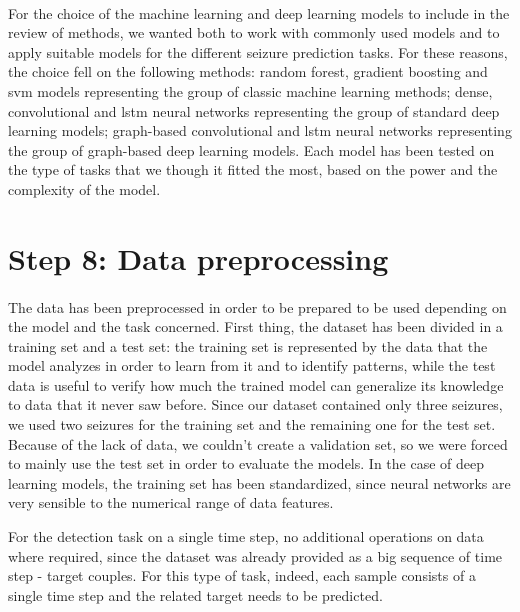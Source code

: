 \paragraph{} For the choice of the machine learning and deep learning models to include in the review of methods, we wanted both to work with commonly used models and to apply suitable models for the different seizure prediction tasks. For these reasons, the choice fell on the following methods: random forest, gradient boosting and \acs{svm} models representing the group of classic machine learning methods; dense, convolutional and \acs{lstm} neural networks representing the group of standard deep learning models; graph-based convolutional and \acs{lstm} neural networks representing the group of graph-based deep learning models. Each model has been tested on the type of tasks that we though it fitted the most, based on the power and the complexity of the model.


\section{Step 8: Data preprocessing} \label{sec: step_data_preprocessing}
\paragraph{} The data has been preprocessed in order to be prepared to be used depending on the model and the task concerned. First thing, the dataset has been divided in a training set and a test set: the training set is represented by the data that the model analyzes in order to learn from it and to identify patterns, while the test data is useful to verify how much the trained model can generalize its knowledge to data that it never saw before. Since our dataset contained only three seizures, we used two seizures for the training set and the remaining one for the test set. Because of the lack of data, we couldn't create a validation set, so we were forced to mainly use the test set in order to evaluate the models. In the case of deep learning models, the training set has been standardized, since neural networks are very sensible to the numerical range of data features.

For the detection task on a single time step, no additional operations on data where required, since the dataset was already provided as a big sequence of time step - target couples. For this type of task, indeed, each sample consists of a single time step and the related target needs to be predicted.

